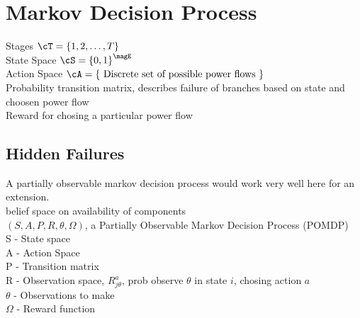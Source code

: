 
\section{Markov Decision Process}
Stages $\cT = \left\{    1, 2, \ldots, T
		\right\}	$			\\
State Space $\cS = \left\{	0 , 1   
			\right\}^{ \magE }$	\\
Action Space $\cA = \left\{     \mbox{ Discrete set of possible power flows }
			\right\}		$			\\
Probability transition matrix, describes failure of branches based on state and choosen power flow \\
Reward for chosing a particular power flow 
\subsection{Hidden Failures}
A partially observable markov decision process would work very well here for an extension. \\
belief space on availability of components	\\
$( S, A, P, R, \theta, \Omega)$, a Partially Observable Markov Decision Process (POMDP) \\
S - State space \\
A - Action Space \\
P - Transition matrix \\
R - Observation space, $ R_{j \theta}^a $, prob observe $\theta$ in state $i$, chosing action $a$ \\
$\theta$ - Observations to make		\\
$\Omega$ - Reward function		
